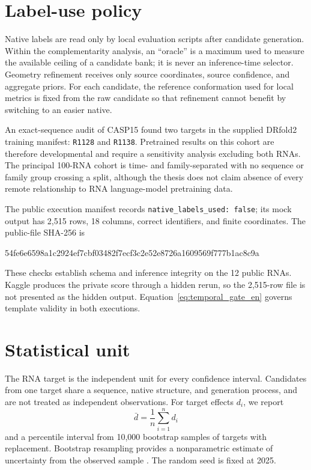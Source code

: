 \documentclass[12pt,a4paper,oneside]{report}
\begin{document}
\section{Label-use policy}

Native labels are read only by local evaluation scripts after candidate generation.
Within the complementarity analysis, an ``oracle'' is a maximum used to measure the
available ceiling of a candidate bank; it is never an inference-time selector. Geometry
refinement receives only source coordinates, source confidence, and aggregate priors.
For each candidate, the reference conformation used for local metrics is fixed from the
raw candidate so that refinement cannot benefit by switching to an easier native.

An exact-sequence audit of CASP15 found two targets in the supplied DRfold2 training
manifest: \texttt{R1128} and \texttt{R1138}. Pretrained results on this cohort are
therefore developmental and require a sensitivity analysis excluding both RNAs. The
principal 100-RNA cohort is time- and family-separated with no sequence or family group
crossing a split, although the thesis does not claim absence of every remote relationship
to RNA language-model pretraining data.

The public execution manifest records \texttt{native\_labels\_used: false}; its mock
output has 2,515 rows, 18 columns, correct identifiers, and finite coordinates. The
public-file SHA-256 is
\begin{center}
\scriptsize\ttfamily 54fe6e6598a1c2924ef7cbf03482f7ecf3c2e52e8726a1609569f777b1ac8c9a
\end{center}
These checks establish schema and inference integrity on the 12 public RNAs. Kaggle
produces the private score through a hidden rerun, so the 2,515-row file is not presented
as the hidden output. Equation~\ref{eq:temporal_gate_en} governs template validity in
both executions.

\section{Statistical unit}

The RNA target is the independent unit for every confidence interval. Candidates from
one target share a sequence, native structure, and generation process, and are not
treated as independent observations. For target effects $d_i$, we report
\begin{equation}
\bar d=\frac{1}{n}\sum_{i=1}^{n}d_i
\end{equation}
and a percentile interval from 10,000 bootstrap samples of targets with replacement.
Bootstrap resampling provides a nonparametric estimate of uncertainty from the observed
sample \cite{bootstrap}. The random seed is fixed at 2025.
\end{document}
